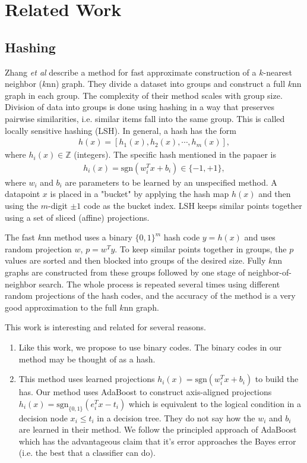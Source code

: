 \documentclass{article}
\begin{document}
\section{Related Work}

\subsection{Hashing}

Zhang {\em et al} \cite{fast_knn} describe a method for fast approximate construction of a $k$-nearest neighbor ($k$nn) graph.  They divide a dataset into groups and construct a full $k$nn graph in each group.  The complexity of their method scales with group size.  Division of data into groups is done using hashing in a way that preserves pairwise similarities, i.e. similar items fall into the same group.  This is called locally sensitive hashing (LSH).  In general, a hash has the form
\begin{gather*}
h(x) = [ h_1(x), h_2(x), \cdots, h_m(x) ],
\end{gather*}
where $h_i(x) \in \mathbb{Z}$ (integers).  The specific hash mentioned in the papaer is
\begin{gather*}
h_i(x) = \text{sgn}(w_i^T x + b_i) \in \{-1, +1\},
\end{gather*}
where $w_i$ and $b_i$ are parameters to be learned by an unspecified method.  A datapoint $x$ is placed in a "bucket" by applying the hash map $h(x)$ and then using the $m$-digit $\pm 1$ code as the bucket index.  LSH keeps similar points together using a set of sliced (affine) projections.

The fast $k$nn method uses a binary $\{0,1\}^m$ hash code $y = h(x)$ and uses random projection $w$, $p = w^T y$.  To keep similar points together in groups, the $p$ values are sorted and then blocked into groups of the desired size.  Fully $k$nn graphs are constructed from these groups followed by one stage of neighbor-of-neighbor search.  The whole process is repeated several times using different random projections of the hash codes, and the accuracy of the method is a very good approximation to the full $k$nn graph.

This work is interesting and related for several reasons.
\begin{enumerate}
\item Like this work, we propose to use binary codes.  The binary codes in our method may be thought of as a hash.
\item This method uses learned projections $h_i(x) = \text{sgn}(w_i^T x + b_i)$ to build the has.  Our method uses AdaBoost to construct axis-aligned projections $h_i(x) = \text{sgn}_{\{0,1\}}(e_i^T x - t_i)$ which is equivalent to the logical condition in a decision node $x_i \leq t_i$ in a decision tree.  They do not say how the $w_i$ and $b_i$ are learned in their method.  We follow the principled approach of AdaBoost which has the advantageous claim that it's error approaches the Bayes error (i.e. the best that a classifier can do).
\end{enumerate}
\end{document}
